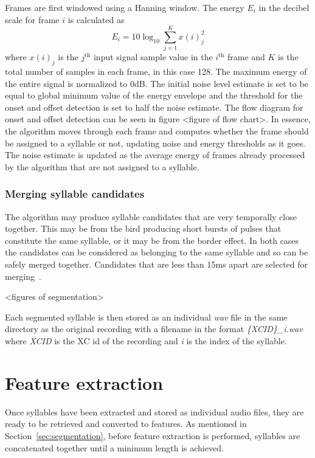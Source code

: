 Frames are first windowed using a Hanning window. The energy $E_i$ in the
decibel scale for frame $i$ is calculated as
\begin{equation}
  E_i = 10 \log_{10} \sum_{j=1}^{K} x{(i)}_{j}^2
\end{equation}
where $x{(i)}_j$ is the $j^{\text{th}}$ input signal sample value in the
$i^{\text{th}}$ frame and $K$ is the total number of samples in each frame, in
this case 128. The maximum energy of the entire signal is normalized to 0dB. The
initial noise level estimate is set to be equal to global minimum value of the
energy envelope and the threshold for the onset and offset detection is set to
half the noise estimate. The flow diagram for onset and offset detection can be
seen in figure <figure of flow chart>. In essence, the algorithm moves through
each frame and computes whether the frame should be assigned to a syllable or
not, updating noise and energy thresholds as it goes. The noise estimate is
updated as the average energy of frames already processed by the algorithm that
are not assigned to a syllable.

\subsubsection{Merging syllable candidates}

The algorithm may produce syllable candidates that are very temporally close
together. This may be from the bird producing short bursts of pulses that
constitute the same syllable, or it may be from the border effect. In both cases
the candidates can be considered as belonging to the same syllable and so can be
safely merged together. Candidates that are less than 15ms apart are selected
for merging~\cite{fagerlund2004automatic}.

<figures of segmentation>

Each segmented syllable is then stored as an individual \textit{wav} file in the
same directory as the original recording with a filename in the format
\textit{\{XCID\}\_i.wav} where \textit{XCID} is the XC id of the recording and
\textit{i} is the index of the syllable.

\section{Feature extraction}

Once syllables have been extracted and stored as individual audio files, they
are ready to be retrieved and converted to features. As mentioned in
Section~\ref{sec:segmentation}, before feature extraction is performed,
syllables are concatenated together until a minimum length is achieved.

